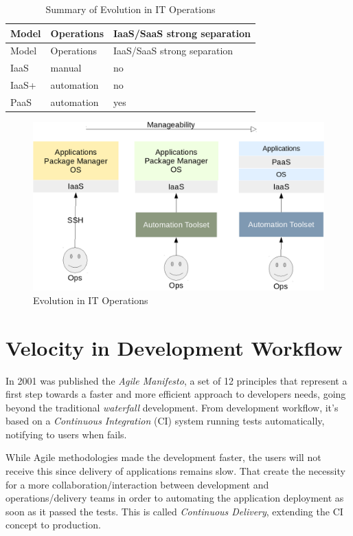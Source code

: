 \begin{longtable}[c]{@{}lll@{}}
\caption{Summary of Evolution in IT Operations}\tabularnewline
\toprule
Model & Operations & IaaS/SaaS strong separation\tabularnewline
\midrule
\endfirsthead
\toprule
Model & Operations & IaaS/SaaS strong separation\tabularnewline
\midrule
\endhead
IaaS & manual & no\tabularnewline
IaaS+ & automation & no\tabularnewline
PaaS & automation & yes\tabularnewline
\bottomrule
\end{longtable}

\begin{figure}[htbp]
\centering
\includegraphics{media/ch2-paas.png}
\caption{Evolution in IT Operations}
\end{figure}

\section{Velocity in Development
Workflow}\label{velocity-in-development-workflow}

In 2001 was published the \emph{Agile Manifesto}, a set of 12 principles
that represent a first step towards a faster and more efficient approach
to developers needs, going beyond the traditional \emph{waterfall}
development. From development workflow, it's based on a \emph{Continuous
Integration} (CI) system running tests automatically, notifying to users
when fails.

While Agile methodologies made the development faster, the users will
not receive this since delivery of applications remains slow. That
create the necessity for a more collaboration/interaction between
development and operations/delivery teams in order to automating the
application deployment as soon as it passed the tests. This is called
\emph{Continuous Delivery}, extending the CI concept to production.


